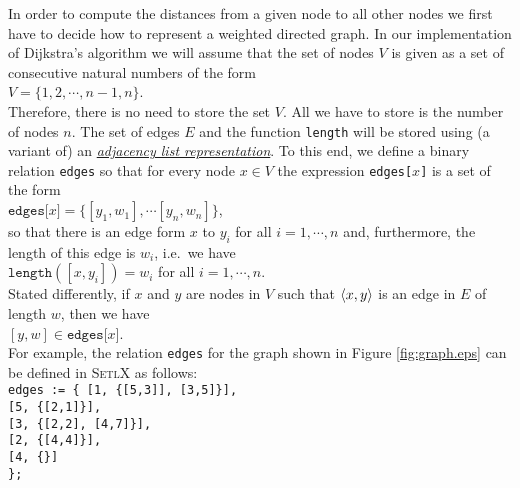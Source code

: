 In order to compute the distances from a given node to all other nodes we first have to decide how
to represent a weighted directed graph.  In our implementation of Dijkstra's algorithm we will
assume that the set of nodes $V$ is given as a set of consecutive natural numbers of the form
\\[0.2cm]
\hspace*{1.3cm}
$V = \{ 1, 2, \cdots, n-1, n \}$.
\\[0.2cm]
Therefore, there is no need to store the set $V$.  All we have to store is the number of nodes $n$.
The set of edges $E$ and the function \texttt{length} will be stored using (a variant of) an
\href{http://en.wikipedia.org/wiki/Adjacency_list}{\emph{adjacency list representation}}.
To this end, we define a binary relation \texttt{edges} so that for every node $x \in V$ the
expression \texttt{edges[$x$]} is a set of the form
\\[0.2cm]
\hspace*{1.3cm}
$\texttt{edges[}x\mathtt{]} = \{ [y_1,w_1], \cdots [y_n,w_n] \}$, 
\\[0.2cm]
so that there is an edge form $x$ to $y_i$ for all $i=1,\cdots,n$ and, furthermore, the length of
this edge is $w_i$, i.e.~we have 
\\[0.2cm]
\hspace*{1.3cm}
$\mathtt{length}([x,y_i]) = w_i$ \quad for all $i=1,\cdots,n$.
\\[0.2cm]
Stated differently, if $x$ and $y$ are nodes in $V$ such that $\pair(x,y)$ is an edge in $E$ of length
$w$, then we have
\\[0.2cm]
\hspace*{1.3cm}
$[y,w] \in \mathtt{edges[}x\mathtt{]}$.
\\[0.2cm]
For example, the relation \texttt{edges} for the graph shown in Figure \ref{fig:graph.eps} can be
defined in \textsc{SetlX} as follows:
\\[0.2cm]
\hspace*{1.3cm}  \texttt{edges := \{ [1, \{[5,3]], [3,5]\}], \\
\hspace*{3.25cm}                     [5, \{[2,1]\}],         \\
\hspace*{3.25cm}                     [3, \{[2,2], [4,7]\}],  \\
\hspace*{3.25cm}                     [2, \{[4,4]\}],         \\
\hspace*{3.25cm}                     [4, \{\}]               \\
\hspace*{2.9cm}                  \};}


